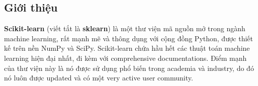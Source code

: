 \subsection{Giới thiệu}
\textbf{Scikit-learn} 
(viết tắt là \textbf{sklearn}) là một thư viện mã nguồn mở trong ngành machine learning, 
rất mạnh mẽ và thông dụng với cộng đồng Python, được thiết kế trên nền NumPy và SciPy. 
Scikit-learn chứa hầu hết các thuật toán machine learning hiện đại nhất, 
đi kèm với comprehensive documentations. Điểm mạnh của thư viện này là nó được sử dụng phổ biến trong academia và industry, 
do đó nó luôn được updated và có một very active user community. \break